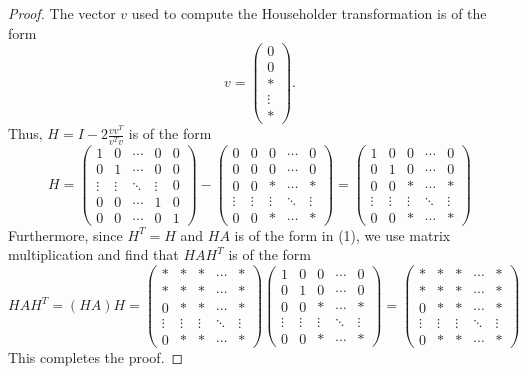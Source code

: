 \documentclass[10pt]{article}
\begin{document}
\begin{enumerate}
\begin{proof}
The vector $v$ used to compute the Householder transformation is of the form $$
v = \begin{pmatrix}
0 \\
0 \\
* \\
\vdots \\
*
\end{pmatrix}.
$$ Thus, $H = I - 2 \frac{v v^T}{v^T v}$ is of the form $$
H = \begin{pmatrix}
1 & 0 & \cdots & 0 & 0 \\
0 & 1 & \cdots & 0 & 0 \\
\vdots & \vdots & \ddots & \vdots & 0 \\
0 & 0 & \cdots & 1 & 0 \\
0 & 0 & \cdots & 0 & 1
\end{pmatrix} - 
\begin{pmatrix}
0 & 0 & 0 & \cdots & 0 \\
0 & 0 & 0 & \cdots & 0 \\
0 & 0 & * & \cdots & * \\
\vdots & \vdots & \vdots & \ddots & \vdots \\
0 & 0 & * & \cdots & *
\end{pmatrix} =
\begin{pmatrix}
1 & 0 & 0 & \cdots & 0 \\
0 & 1 & 0 & \cdots & 0 \\
0 & 0 & * & \cdots & * \\
\vdots & \vdots & \vdots & \ddots & \vdots \\
0 & 0 & * & \cdots & *
\end{pmatrix}
$$ Furthermore, since $H^T = H$ and $HA$ is of the form in (1), we use matrix multiplication and find that $ HAH^T $ is of the form $$
HAH^T = (HA)H = \begin{pmatrix}
* & * & * & \cdots & * \\
* & * & * & \cdots & * \\
0 & * & * & \cdots & * \\
\vdots & \vdots & \vdots & \ddots & \vdots \\
0 & * & * & \cdots & *
\end{pmatrix}
\begin{pmatrix}
1 & 0 & 0 & \cdots & 0 \\
0 & 1 & 0 & \cdots & 0 \\
0 & 0 & * & \cdots & * \\
\vdots & \vdots & \vdots & \ddots & \vdots \\
0 & 0 & * & \cdots & *
\end{pmatrix} = \begin{pmatrix}
* & * & * & \cdots & * \\
* & * & * & \cdots & * \\
0 & * & * & \cdots & * \\
\vdots & \vdots & \vdots & \ddots & \vdots \\
0 & * & * & \cdots & *
\end{pmatrix}
$$ This completes the proof.
\end{proof}


\end{enumerate}
\end{document}
